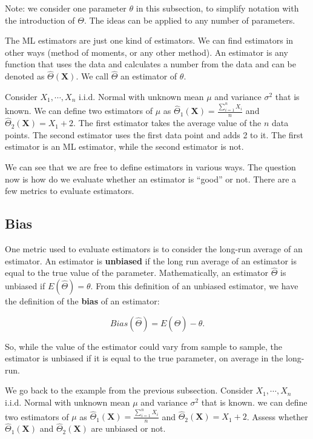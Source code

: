 \documentclass[
]{book}
\begin{document}
Note: we consider one parameter \(\theta\) in this subsection, to simplify notation with the introduction of \(\Theta\). The ideas can be applied to any number of parameters.

The ML estimators are just one kind of estimators. We can find estimators in other ways (method of moments, or any other method). An estimator is any function that uses the data and calculates a number from the data and can be denoted as \(\hat{\Theta}(\boldsymbol{X})\). We call \(\hat{\Theta}\) an estimator of \(\theta\).

Consider \(X_1, \cdots, X_n\) i.i.d. Normal with unknown mean \(\mu\) and variance \(\sigma^2\) that is known. We can define two estimators of \(\mu\) as \(\hat{\Theta}_1(\boldsymbol{X}) = \frac{\sum_{i=1}^n X_i}{n}\) and \(\hat{\Theta}_2(\boldsymbol{X}) = X_1 + 2\). The first estimator takes the average value of the \(n\) data points. The second estimator uses the first data point and adds 2 to it. The first estimator is an ML estimator, while the second estimator is not.

We can see that we are free to define estimators in various ways. The question now is how do we evaluate whether an estimator is ``good'' or not. There are a few metrics to evaluate estimators.

\subsection{Bias}\label{bias}

One metric used to evaluate estimators is to consider the long-run average of an estimator. An estimator is \textbf{unbiased} if the long run average of an estimator is equal to the true value of the parameter. Mathematically, an estimator \(\hat{\Theta}\) is unbiased if \(E(\hat{\Theta}) = \theta\). From this definition of an unbiased estimator, we have the definition of the \textbf{bias} of an estimator:

\begin{equation} 
Bias(\hat{\Theta}) = E(\hat{\Theta}) - \theta.
\label{eq:7-bias}
\end{equation}

So, while the value of the estimator could vary from sample to sample, the estimator is unbiased if it is equal to the true parameter, on average in the long-run.

We go back to the example from the previous subsection. Consider \(X_1, \cdots, X_n\) i.i.d. Normal with unknown mean \(\mu\) and variance \(\sigma^2\) that is known. we can define two estimators of \(\mu\) as \(\hat{\Theta}_1(\boldsymbol{X}) = \frac{\sum_{i=1}^n X_i}{n}\) and \(\hat{\Theta}_2(\boldsymbol{X}) = X_1 + 2\). Assess whether \(\hat{\Theta}_1(\boldsymbol{X})\) and \(\hat{\Theta}_2(\boldsymbol{X})\) are unbiased or not.
\end{document}
